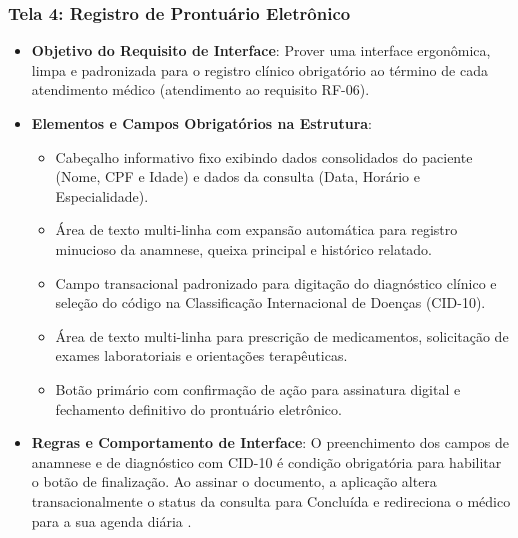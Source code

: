 \subsubsection{Tela 4: Registro de Prontuário Eletrônico}
\begin{itemize}
    \item \textbf{Objetivo do Requisito de Interface}: Prover uma interface ergonômica, limpa e padronizada para o registro clínico obrigatório ao término de cada atendimento médico (atendimento ao requisito RF-06).
    \item \textbf{Elementos e Campos Obrigatórios na Estrutura}:
    \begin{itemize}
        \item Cabeçalho informativo fixo exibindo dados consolidados do paciente (Nome, CPF e Idade) e dados da consulta (Data, Horário e Especialidade).
        \item Área de texto multi-linha com expansão automática para registro minucioso da anamnese, queixa principal e histórico relatado.
        \item Campo transacional padronizado para digitação do diagnóstico clínico e seleção do código na Classificação Internacional de Doenças (CID-10).
        \item Área de texto multi-linha para prescrição de medicamentos, solicitação de exames laboratoriais e orientações terapêuticas.
        \item Botão primário com confirmação de ação para assinatura digital e fechamento definitivo do prontuário eletrônico.
    \end{itemize}
    \item \textbf{Regras e Comportamento de Interface}: O preenchimento dos campos de anamnese e de diagnóstico com CID-10 é condição obrigatória para habilitar o botão de finalização. Ao assinar o documento, a aplicação altera transacionalmente o status da consulta para Concluída e redireciona o médico para a sua agenda diária \cite{nielsen1993}.
\end{itemize}

